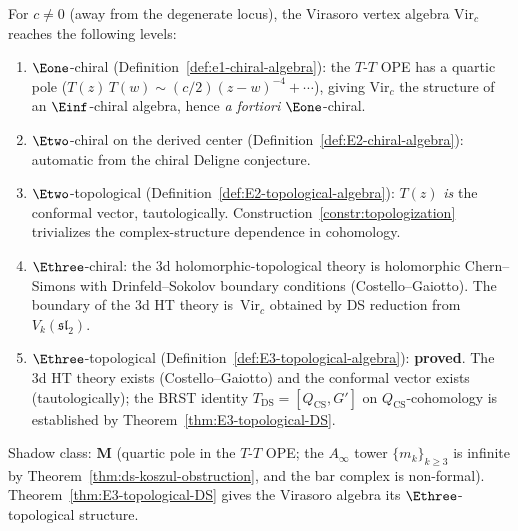 \begin{remark}
\label{rem:virasoro-EN-level}
For $c \ne 0$ (away from the degenerate locus), the
Virasoro vertex algebra $\mathrm{Vir}_c$ reaches the
following levels:
\begin{enumerate}[label=\textup{(\roman*)}]
\item $\Eone$-chiral
 (Definition~\ref{def:e1-chiral-algebra}): the $T$-$T$
 OPE has a quartic pole
 ($T(z)\,T(w) \sim (c/2)(z-w)^{-4} + \cdots$), giving
 $\mathrm{Vir}_c$ the structure of an $\Einf$-chiral
 algebra, hence \emph{a fortiori} $\Eone$-chiral.

\item $\Etwo$-chiral on the derived center
 (Definition~\ref{def:E2-chiral-algebra}): automatic from
 the chiral Deligne conjecture.

\item $\Etwo$-topological
 (Definition~\ref{def:E2-topological-algebra}):
 $T(z)$ \emph{is} the conformal vector, tautologically.
 Construction~\ref{constr:topologization} trivializes
 the complex-structure dependence in cohomology.

\item $\Ethree$-chiral: the 3d holomorphic-topological
 theory is holomorphic Chern--Simons with
 Drinfeld--Sokolov boundary conditions
 (Costello--Gaiotto). The boundary of the 3d HT theory
 is~$\mathrm{Vir}_c$ obtained by DS reduction from
 $V_k(\mathfrak{sl}_2)$.

\item $\Ethree$-topological
 (Definition~\ref{def:E3-topological-algebra}):
 \textbf{proved}. The 3d HT theory exists
 (Costello--Gaiotto) and the conformal vector exists
 (tautologically); the BRST identity
 $T_{\mathrm{DS}} = [Q_{\mathrm{CS}}, G']$ on
 $Q_{\mathrm{CS}}$-cohomology is established by
 Theorem~\ref{thm:E3-topological-DS}.
\end{enumerate}
Shadow class: $\mathbf{M}$ (quartic pole in the $T$-$T$
OPE; the $A_\infty$ tower $\{m_k\}_{k \ge 3}$ is infinite
by Theorem~\ref{thm:ds-koszul-obstruction}, and the
bar complex is non-formal).
Theorem~\ref{thm:E3-topological-DS} gives the Virasoro algebra its
$\Ethree$-topological structure.
\end{remark}
